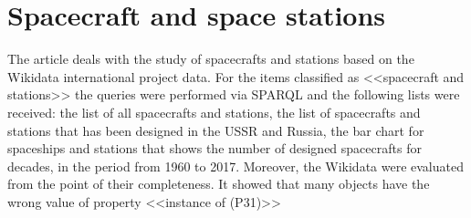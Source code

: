 
\setchapterpreamble[u]{\margintoc}
\chapter{Spacecraft and space stations\protect\footnotemark}

The article deals with the study of spacecrafts and stations based on the Wikidata international project data. For the items classified as <<spacecraft and stations>> the queries were performed via SPARQL and the following lists were received: the list of all spacecrafts and stations, the list of spacecrafts and stations that has been designed in the USSR and Russia, the bar chart for spaceships and stations that shows the number of designed spacecrafts for decades, in the period from 1960 to 2017. Moreover, the Wikidata were evaluated from the point of their completeness. It showed that many objects have the wrong value of property <<instance of (P31)>>
